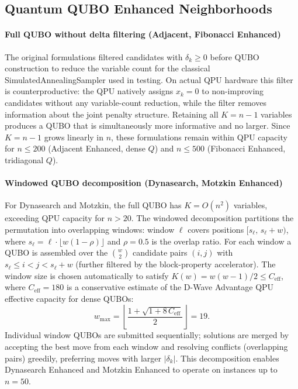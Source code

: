 \documentclass[preprint,12pt,authoryear]{elsarticle}
\begin{document}
\subsection{Quantum QUBO Enhanced Neighborhoods}
\label{sec:enhanced}

\paragraph{Full QUBO without delta filtering \textup{(Adjacent, Fibonacci Enhanced)}}
The original formulations filtered candidates with $\delta_k \geq 0$
before QUBO construction to reduce the variable count for the
classical SimulatedAnnealingSampler used in testing. On actual QPU
hardware this filter is counterproductive: the QPU natively assigns
$x_k = 0$ to non-improving candidates without any variable-count
reduction, while the filter removes information about the joint
penalty structure. Retaining all $K = n - 1$ variables produces a
QUBO that is simultaneously more informative and no larger.
Since $K = n - 1$ grows linearly in $n$, these formulations remain
within QPU capacity for $n \leq 200$ (Adjacent Enhanced, dense $Q$)
and $n \leq 500$ (Fibonacci Enhanced, tridiagonal $Q$).

\paragraph{Windowed QUBO decomposition \textup{(Dynasearch, Motzkin Enhanced)}}
For Dynasearch and Motzkin, the full QUBO has $K = O(n^2)$ variables,
exceeding QPU capacity for $n > 20$. The windowed decomposition
partitions the permutation into overlapping windows: window $\ell$
covers positions $[s_\ell,\, s_\ell + w)$, where $s_\ell = \ell \cdot
\lfloor w(1 - \rho) \rfloor$ and $\rho = 0.5$ is the overlap ratio.
For each window a QUBO is assembled over the
$\binom{w}{2}$ candidate pairs $(i,j)$ with $s_\ell \leq i < j < s_\ell + w$
(further filtered by the block-property accelerator).
The window size is chosen automatically to satisfy
$K(w) = w(w-1)/2 \leq C_{\mathrm{eff}}$, where $C_{\mathrm{eff}} = 180$
is a conservative estimate of the D-Wave Advantage QPU effective capacity for
dense QUBOs:
\begin{equation}
  w_{\max} = \left\lfloor
    \frac{1 + \sqrt{1 + 8\,C_{\mathrm{eff}}}}{2}
  \right\rfloor = 19.
  \label{eq:window}
\end{equation}
Individual window QUBOs are submitted sequentially; solutions are merged
by accepting the best move from each window and resolving conflicts
(overlapping pairs) greedily, preferring moves with larger
$|\delta_k|$. This decomposition enables Dynasearch Enhanced and
Motzkin Enhanced to operate on instances up to $n = 50$.
\end{document}
